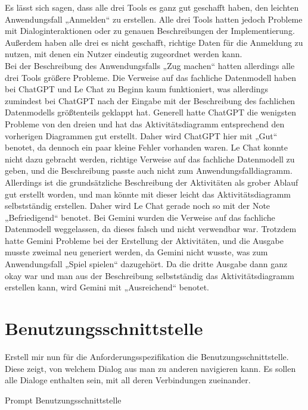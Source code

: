 Es lässt sich sagen, dass alle drei Tools es ganz gut geschafft haben, den leichten Anwendungsfall „Anmelden“ zu erstellen. Alle drei Tools 
hatten jedoch Probleme mit Dialoginteraktionen oder zu genauen Beschreibungen der Implementierung. Außerdem haben alle drei es nicht geschafft, 
richtige Daten für die Anmeldung zu nutzen, mit denen ein Nutzer eindeutig zugeordnet werden kann.\\
Bei der Beschreibung des Anwendungsfalls „Zug machen“ hatten allerdings alle drei Tools größere Probleme. Die Verweise auf das fachliche 
Datenmodell haben bei ChatGPT und Le Chat zu Beginn kaum funktioniert, was allerdings zumindest bei ChatGPT nach der Eingabe mit der Beschreibung 
des fachlichen Datenmodells größtenteils geklappt hat. Generell hatte ChatGPT die wenigsten Probleme von den dreien und hat das Aktivitätsdiagramm 
entsprechend den vorherigen Diagrammen gut erstellt. Daher wird ChatGPT hier mit „Gut“ benotet, da dennoch ein paar kleine Fehler vorhanden 
waren. Le Chat konnte nicht dazu gebracht werden, richtige Verweise auf das fachliche Datenmodell zu geben, und die Beschreibung passte auch 
nicht zum Anwendungsfalldiagramm. Allerdings ist die grundsätzliche Beschreibung der Aktivitäten als grober Ablauf gut erstellt worden, und man 
könnte mit dieser leicht das Aktivitätsdiagramm selbstständig erstellen. Daher wird Le Chat gerade noch so mit der Note „Befriedigend“ benotet. 
Bei Gemini wurden die Verweise auf das fachliche Datenmodell weggelassen, da dieses falsch und nicht verwendbar war. Trotzdem hatte Gemini 
Probleme bei der Erstellung der Aktivitäten, und die Ausgabe musste zweimal neu generiert werden, da Gemini nicht wusste, was zum Anwendungsfall 
„Spiel spielen“ dazugehört. Da die dritte Ausgabe dann ganz okay war und man aus der Beschreibung selbstständig das Aktivitätsdiagramm erstellen 
kann, wird Gemini mit „Ausreichend“ benotet.

\section*{Benutzungsschnittstelle}

\begin{prompt}[H]
    \begin{tcolorbox}[colback=gray!20, colframe=gray!20, boxrule=0pt, sharp corners] 
        Erstell mir nun für die Anforderungsspezifikation die Benutzungsschnittstelle. Diese zeigt, von welchem Dialog aus man zu anderen 
        navigieren kann. Es sollen alle Dialoge enthalten sein, mit all deren Verbindungen zueinander.
        \vfill
    \end{tcolorbox}
    \caption{Prompt Benutzungsschnittstelle}
    \label{Prompt Benutzungsschnittstelle}
\end{prompt}

